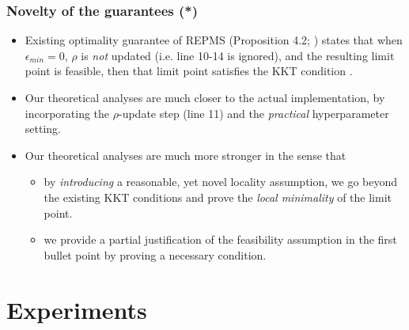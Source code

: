\documentclass{beamer}
\begin{document}
\begin{frame}
	\frametitle{Novelty of the guarantees (*)}
	\begin{itemize}
		\item Existing optimality guarantee of REPMS (Proposition 4.2; \cite{repms}) states that when $\epsilon_{min} = 0$, $\rho$ is {\it not} updated (i.e. line 10-14 is ignored), and the resulting limit point is feasible, then that limit point satisfies the KKT condition \cite{optimality-manifold}.
		
		\item Our theoretical analyses are much closer to the actual implementation, by incorporating the $\rho$-update step (line 11) and the {\it practical} hyperparameter setting.
		
		\item Our theoretical analyses are much more stronger in the sense that
		\begin{itemize}
			\item by {\it introducing} a reasonable, yet novel locality assumption, we go beyond the existing KKT conditions and prove the {\it local minimality} of the limit point.
			
			\item we provide a partial justification of the feasibility assumption in the first bullet point by proving a necessary condition.
		\end{itemize}
	\end{itemize}
\end{frame}

\section{Experiments}
\end{document}
